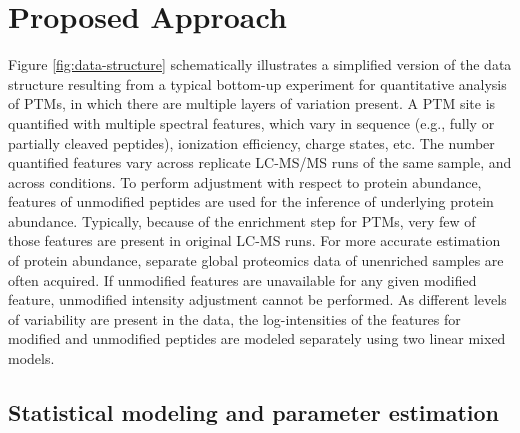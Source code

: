 \documentclass[mcp]{article}
\numberwithin{figure}{section} %
\numberwithin{table}{section}
\begin{document}
\section{Proposed Approach}

Figure \ref{fig:data-structure} schematically illustrates a simplified version of the data structure resulting from a typical bottom-up experiment for quantitative analysis of PTMs, in which there are multiple layers of variation present. A PTM site is quantified with multiple spectral features, which vary in sequence (e.g., fully or partially cleaved peptides), ionization efficiency, charge states, etc. The number quantified features vary across replicate LC-MS/MS runs of the same sample, and across conditions. To perform adjustment with respect to protein abundance, features of unmodified peptides are used for the inference of underlying protein abundance. Typically, because of the enrichment step for PTMs, very few of those features are present in original LC-MS runs. For more accurate estimation of protein abundance, separate global proteomics data of unenriched samples are often acquired. If unmodified features are unavailable for any given modified feature, unmodified intensity adjustment cannot be performed. As different levels of variability are present in the data, the log-intensities of the features for modified and unmodified peptides are modeled separately using two linear mixed models. 

\subsection*{Statistical modeling and parameter estimation}
\end{document}
